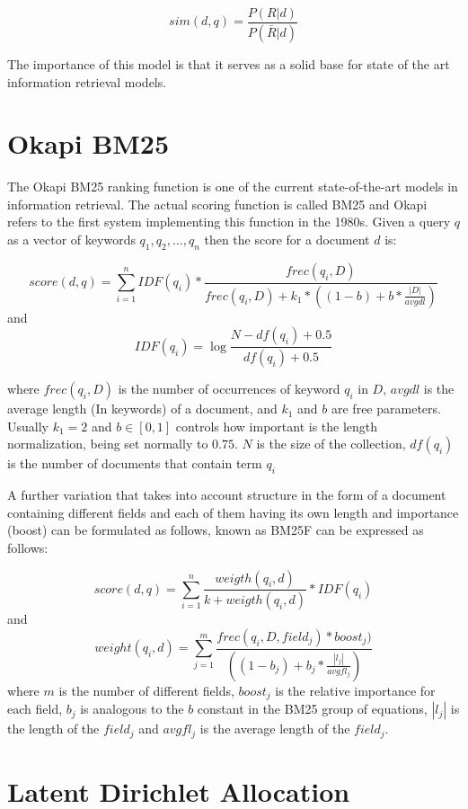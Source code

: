 $$sim(d,q) = \frac{ P(R|d)} {P(\bar{R} |d)} $$

The importance of this model is that it serves as a solid base for state of the art information retrieval models.

\section{Okapi BM25}

The Okapi BM25 ranking function is one of the current state-of-the-art models in information retrieval\cite{okapibm25}. The actual scoring function is called BM25 and Okapi refers to the first system implementing this function in the 1980s. 
Given a query $q$ as a vector of keywords $q_{1}, q_{2}, ... , q_{n}$ then the score for a document $d$ is:

$$score(d, q) = \sum_{i=1}^{n}IDF{(q_i)}*\frac{ frec(q_i, D)}{frec(q_i, D)+k_1*((1-b)+b*\frac{|D|}{avgdl})} $$
and $$IDF(q_i) = \log{\frac{N - df(q_i)+0.5}{df(q_i)+0.5}} $$

where $frec(q_i, D)$ is the number of occurrences of keyword $q_i$ in $D$, $avgdl$ is the average length (In keywords) of a document, and $k_1$ and $b$ are free parameters. Usually $k_1 = 2$ and $b \in [0, 1]$ controls how important is the length normalization, being set normally to $0.75$. $N$ is the size of the collection, $df(q_i)$ is the number of documents that contain term $q_i$ 

A further variation that takes into account structure in the form of a document containing different fields and each of them having its own length and importance (boost) can be formulated as follows, known as BM25F can be expressed as follows:


$$score(d, q) = \sum_{i=1}^{n} \frac{weigth(q_i, d)}{k+ weigth(q_i, d)} * IDF(q_i)$$
and 
$$weight(q_i, d) = \sum_{j=1}^m \frac{frec(q_i, D, field_j)*boost_j)}{((1-b_j) + b_j*\frac{|l_j|}{avgfl_j})} $$
where $m$ is the number of different fields, $boost_j$ is the relative importance for each field, $b_j$ is analogous to the $b$ constant in the BM25 group of equations, $|l_j|$ is the length of the $field_j$ and $avgfl_j$ is the average length of the $field_j$.

\section{Latent Dirichlet Allocation}

